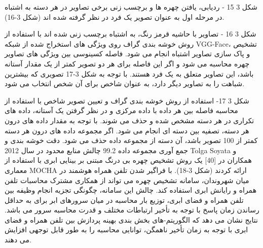 شکل ‏3 15 - ردیابی، یافتن چهره ها و برچسب زنی
	برخی تصاویر در هر دسته به اشتباه در مرحله اول به عنوان تصویر یک فرد در نظر گرفته شده اند (شکل 3-16).
 
شکل ‏3 16 - تصاویر با حاشیه قرمز رنگ، به اشتباه برچسب زنی شده اند
با استفاده از روش خوشه بندی گراف  روی ویژگی های استخراج شده از شبكه VGG-Face، تشخیص و پاک سازی تصاویر اشتباه انجام می شود. فاصله کسینوسی بین ویژگی های تصاویر چهره محاسبه می شود و اگر این فاصله برای هر دو تصویر کمتر از یک مقدار آستانه باشد، این تصاویر متعلق به یک فرد هستند. با توجه به شکل 3-17 تصویری که بیشترین شباهت را به تصاویر دیگر دارد، به عنوان شاخص برای آن شخص انتخاب می شود.
 
شکل ‏3 17- استفاده از روش خوشه بندی گراف و تعیین تصویر شاخص
	با استفاده از محاسبه فاصله بین هر داده با داده مرکزی و در نظر گرفتن یک آستانه، داده های تكراری در هر دسته مشخص شده و حذف  می شوند.
	با توجه به مقدار داده های درون هر دسته، تصفیه بین دسته ای انجام می شود. اگر مجموعه داده های درون هر دسته کمتر از 100 تصویر باشد، آن دسته از مجموعه داده حذف می شود.
دقت خوشه بندی و جمع آوری مجموعه داده 99.2%
	چالش منابع محدود
در سال 2012 Tolga Soyata و همکاران در [40] یک روش تشخیص چهره بی درنگ مبتنی بر بینایی ابری  با استفاده از معماری MOCHA ارائه کردند (شکل 3-18). با فراگیر شدن تلفن همراه هوشمند در میان شهروندان، سامانه تشخیص چهره می تواند از همکاری مشترک محاسبات تلفن همراه و رایانش ابری استفاده کند. چالش این سامانه، چگونگی تجزیه انجام وظیفه بین تلفن همراه و فضای ابری، توزیع بار محاسبه در میان سرورهای ابر برای به حداقل رساندن زمان پاسخ با توجه به تأخیر ارتباطات مختلف و قدرت محاسبه سرور می باشد. نتایج نشان می دهد که الگوریتم-های بخش بندی بهینه پردازش بین تلفن همراه و فضای ابری با توجه به زمان تأخیر ناهمگن، توانایی محاسبه را به طور قابل توجهی افزایش می دهند. 
 
